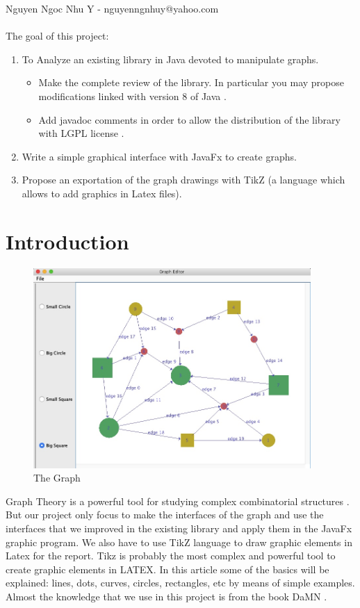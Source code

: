 \documentclass[a4paper,10pt]{article}
\begin{document}
Nguyen Ngoc Nhu Y - nguyenngnhuy@yahoo.com\\
\\
The goal of this project:
\begin{enumerate}
	\item To Analyze an existing library in Java devoted to manipulate graphs.
	\begin{itemize}
		\item Make the complete review of the library. In particular you may propose modifications linked with version 8 of Java \cite{cite-key5}.
		\item Add javadoc comments \cite{cite-key6} in order to allow the distribution of the library with LGPL license \cite{cite-key7}.
	\end{itemize}
	\item Write a simple graphical interface with JavaFx to create graphs.
	\item Propose an exportation of the graph drawings with TikZ (a language which allows to add graphics in Latex files).
\end{enumerate}
\cleardoublepage
%

\tableofcontents
\thispagestyle{empty}
\cleardoublepage
\setcounter{page}{1}
%

\section{Introduction}\label{sec:intro}
	\begin{figure}[H]
		\centering
		\includegraphics[height = 3in]{image1.jpg}
		\caption[Optional caption]{The Graph}
		\label{fig:Image1}
	\end{figure}
Graph Theory is a powerful tool for studying complex combinatorial structures \cite{cite-key1}. But our project only focus to make the interfaces of the graph and use the interfaces that we improved in the existing library and apply them in the JavaFx \cite{cite-key4} graphic program.
We also have to use TikZ language to draw graphic elements in Latex \cite{cite-key2} for the report. Tikz is probably the most complex and powerful tool to create graphic elements in LATEX. In this article some of the basics will be explained: lines, dots, curves, circles, rectangles, etc by means of simple examples.
Almost the knowledge that we use in this project is from the book DaMN \cite{cite-key3}.
%
\end{document}
